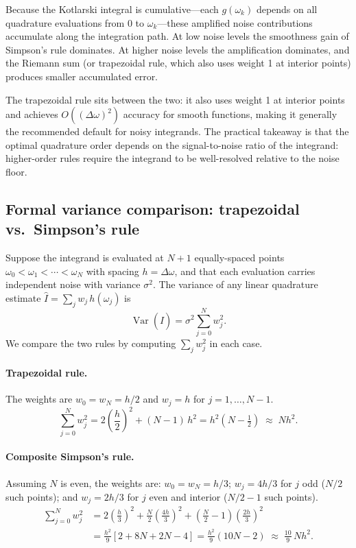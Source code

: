 \documentclass[11pt]{article}
\begin{document}
Because the Kotlarski integral is cumulative---each $g(\omega_k)$ depends
on all quadrature evaluations from $0$ to $\omega_k$---these amplified
noise contributions accumulate along the integration path.  At low noise
levels the smoothness gain of Simpson's rule dominates.  At higher noise
levels the amplification dominates, and the Riemann sum (or trapezoidal
rule, which also uses weight 1 at interior points) produces smaller
accumulated error.

The trapezoidal rule sits between the two: it also uses weight 1 at
interior points and achieves $O((\Delta\omega)^2)$ accuracy for smooth
functions, making it generally the recommended default for noisy
integrands.  The practical takeaway is that the optimal quadrature order
depends on the signal-to-noise ratio of the integrand: higher-order rules
require the integrand to be well-resolved relative to the noise floor.

\subsection*{Formal variance comparison: trapezoidal vs.\ Simpson's rule}

Suppose the integrand is evaluated at $N+1$ equally-spaced points
$\omega_0 < \omega_1 < \cdots < \omega_N$ with spacing $h = \Delta\omega$,
and that each evaluation carries independent noise with variance $\sigma^2$.
The variance of any linear quadrature estimate $\hat I = \sum_j w_j\,h(\omega_j)$
is
\[
    \operatorname{Var}(\hat I) = \sigma^2 \sum_{j=0}^{N} w_j^2.
\]
We compare the two rules by computing $\sum_j w_j^2$ in each case.

\paragraph{Trapezoidal rule.}
The weights are $w_0 = w_N = h/2$ and $w_j = h$ for $j = 1,\ldots,N-1$.
\[
    \sum_{j=0}^N w_j^2
    = 2\!\left(\frac{h}{2}\right)^{\!2} + (N-1)\,h^2
    = h^2\!\left(N - \tfrac{1}{2}\right)
    \;\approx\; Nh^2.
\]

\paragraph{Composite Simpson's rule.}
Assuming $N$ is even, the weights are: $w_0 = w_N = h/3$; $w_j = 4h/3$
for $j$ odd ($N/2$ such points); and $w_j = 2h/3$ for $j$ even and interior
($N/2 - 1$ such points).
\begin{align*}
    \sum_{j=0}^N w_j^2
    &= 2\!\left(\frac{h}{3}\right)^{\!2}
       + \frac{N}{2}\!\left(\frac{4h}{3}\right)^{\!2}
       + \left(\frac{N}{2}-1\right)\!\left(\frac{2h}{3}\right)^{\!2} \\
    &= \frac{h^2}{9}\!\left[2 + 8N + 2N - 4\right]
     = \frac{h^2}{9}(10N - 2)
    \;\approx\; \frac{10}{9}\,Nh^2.
\end{align*}
\end{document}
